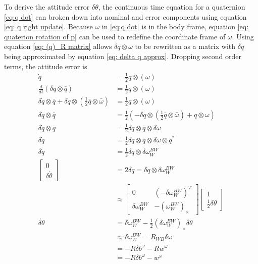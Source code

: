 To derive the attitude error $\delta \theta$, the continuous time equation for a quaternion \eqref{eq:q dot} can broken down into nominal and error components using equation \eqref{eq: q right update}. Because $\omega$ in \eqref{eq:q dot} is in the body frame, equation \eqref{eq: quaterion rotation of p} can be used to redefine the coordinate frame of $\omega$. Using equation \eqref{eq: (q)_R matrix} allows $\delta q \otimes \omega$ to be rewritten as a matrix with $\delta q$ being approximated by equation \eqref{eq: delta q approx}. Dropping second order terms, the attitude error is
\begin{equation}
    \begin{split}
        \dot{q} &= \frac{1}{2} q \otimes (\omega)\\
        \frac{d}{dt} (\delta q \otimes \bar{q}) &= \frac{1}{2} q \otimes (\omega)\\
        \delta \dot{q} \otimes \bar{q} + \delta q \otimes (\frac{1}{2} \bar{q} \otimes \bar{\omega}) &= \frac{1}{2} q \otimes (\omega)\\
        \delta \dot{q} \otimes \bar{q} &= \frac{1}{2} (-\delta q \otimes (\frac{1}{2} \bar{q} \otimes \bar{\omega}) + q \otimes \omega)\\
        \delta \dot{q} \otimes \bar{q} &= \frac{1}{2} \delta q \otimes \bar{q} \otimes \delta \omega \\
        \delta \dot{q} &= \frac{1}{2} \delta q \otimes \bar{q} \otimes \delta \omega \otimes \bar{q}^*\\
        \delta \dot{q} &= \frac{1}{2} \delta q \otimes \delta \omega_W^{BW}\\
        \begin{bmatrix}
            0\\
            \delta \dot{\theta}
        \end{bmatrix}
        &=  2 \delta \dot{q} = \delta q \otimes \delta \omega_W^{BW}\\
        &\approx \begin{bmatrix}
            0 & (-\delta \omega_W^{BW})^T \\
            \delta \omega_W^{BW} & -(\omega_W^{BW})_{\times}
        \end{bmatrix}
        \begin{bmatrix}
            1 \\
            \frac{1}{2} \delta \theta 
        \end{bmatrix}\\
        \dot{\delta \theta} &= \delta \omega_W^{BW} - \frac{1}{2} (\delta \omega_W^{BW})_{\times} \delta \theta\\
        &\approx \delta \omega_W^{BW} = R_{WB} \delta \omega\\
        &= -R \delta b^{\omega} - R w^{\omega}\\
        &=  -R \delta b^{\omega} - w^{\omega}
    \end{split}
    \label{eq: delta theta cont}
\end{equation}
